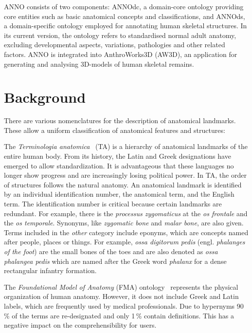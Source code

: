 \documentclass[sw]{iosart2x}
\begin{document}
ANNO consists of two components: ANNOdc, a domain-core ontology providing core entities such as basic anatomical concepts and classifications, and ANNOds, a domain-specific ontology employed for annotating human skeletal structures. In its current version, the ontology  refers to standardised normal adult anatomy, excluding developmental aspects, variations, pathologies and other related factors. ANNO is integrated into AnthroWorks3D (AW3D), an application for generating and analysing 3D-models of human skeletal remains. 



\section{Background}
There are various nomenclatures for the description of anatomical landmarks.
These allow a uniform classification of anatomical features and structures:

The \emph{Terminologia anatomica}~\citep{ta2} (TA) is a hierarchy of anatomical landmarks of the entire human body.
From its history, the Latin and Greek designations have emerged to allow standardization.
It is advantageous that these languages no longer show progress and are increasingly losing political power.
In TA, the order of structures follows the natural anatomy.
An anatomical landmark is identified by an individual identification number, the anatomical term, and the English term.
The identification number is critical because certain landmarks are redundant.
For example, there is the \emph{processus zygomaticus} at the \emph{os frontale} and the \emph{os temporale}.
Synonyms, like \emph{zygomatic bone} and \emph{malar bone}, are also given.
Terms included in the \emph{other} category include eponyms, which are concepts named after people, places or things.
For example, \emph{ossa digitorum pedis} (engl. \emph{phalanges of the foot}) are the small bones of the toes and are also denoted as \emph{ossa phalangea pedis} which are named after the Greek word \emph{phalanx} for a dense rectangular infantry formation.

The \emph{Foundational Model of Anatomy} (FMA) ontology~\citep{fma} represents the physical organization of human anatomy.
However, it does not include Greek and Latin labels, which are frequently used by medical professionals.
Due to hypernyms 90\,\% of the terms are re-designated and only 1\,\% contain definitions.
This has a negative impact on the comprehensibility for users.
\end{document}
